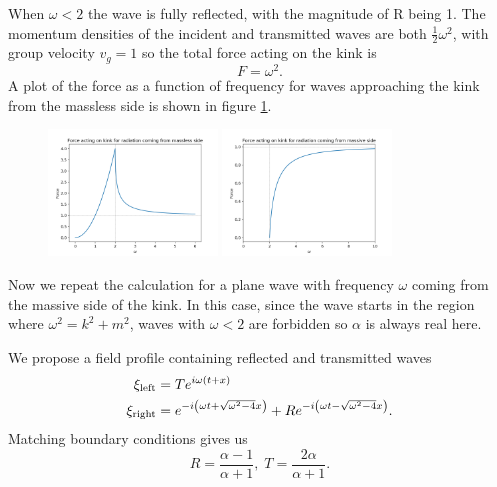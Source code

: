 \documentclass[11pt, oneside,titlepage]{article}  	%
\numberwithin{equation}{section}
\begin{document}
When $\omega<2$ the wave is fully reflected, with the magnitude of R being 1. The momentum densities of the incident and transmitted waves are both $\frac{1}{2}\omega^2$, with group velocity $v_g=1$ so the total force acting on the kink is 
\begin{equation}
F = \omega^2.
\end{equation}
A plot of the force as a function of frequency for waves approaching the kink from the massless side is shown in figure \ref{force_left}.\par
\begin{figure}
\centering
\includegraphics[width=0.4\textwidth]{force_left.png}
\includegraphics[width=0.4\textwidth]{force_right.png}
 \label{force_left}
\end{figure}
Now we repeat the calculation for a plane wave with frequency $\omega$ coming from the massive side of the kink. In this case, since the wave starts in the region where $\omega^2 = k^2 + m^2$, waves with $\omega < 2$ are forbidden so $\alpha$ is always real here. \par
We propose a field profile containing reflected and transmitted waves
\begin{align}
\xi_\textup{left} &= T e^{i\omega (t+x)}\\
\xi_\textup{right} &= e^{-i\left( \omega t + \sqrt{\omega^2-4} x \right )} + Re^{-i\left( \omega t - \sqrt{\omega^2-4} x \right )} .
\end{align}
Matching boundary conditions gives us
\begin{equation}
R = \frac{\alpha-1}{\alpha+1},\; T = \frac{2\alpha}{\alpha+1}.
\end{equation}
\end{document}
